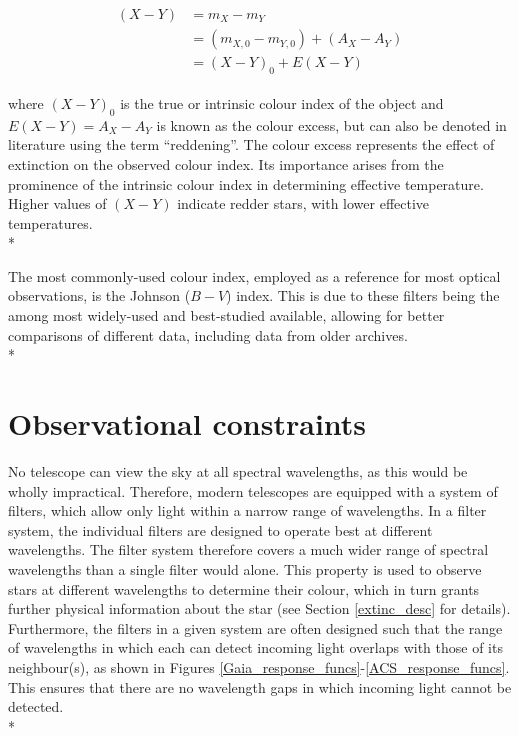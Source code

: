 \documentclass[12pt, a4paper]{report}
\begin{document}
\begin{align}
\begin{split}
(X-Y) &= m_{X} - m_{Y} \\
 &= (m_{X,0} - m_{Y,0}) + (A_{X} - A_{Y}) \\
 &= (X-Y)_{0} + E(X-Y)
\end{split}
\end{align}

where $(X-Y)_{0}$ is the true or intrinsic colour index of the object and $E(X-Y) = A_{X} - A_{Y}$ is known as the colour excess, but can also be denoted in literature using the term ``reddening''. The colour excess represents the effect of extinction on the observed colour index. Its importance arises from the prominence of the intrinsic colour index in determining effective temperature. Higher values of $(X-Y)$ indicate redder stars, with lower effective temperatures.\\*

The most commonly-used colour index, employed as a reference for most optical observations, is the Johnson ($B-V$) index. This is due to these filters being the among most widely-used and best-studied available, allowing for better comparisons of different data, including data from older archives.\\*

\section{Observational constraints}
No telescope can view the sky at all spectral wavelengths, as this would be wholly impractical. Therefore, modern telescopes are equipped with a system of filters, which allow only light within a narrow range of wavelengths. In a filter system, the individual filters are designed to operate best at different wavelengths. The filter system therefore covers a much wider range of spectral wavelengths than a single filter would alone. This property is used to observe stars at different wavelengths to determine their colour, which in turn grants further physical information about the star (see Section \ref{extinc_desc} for details). Furthermore, the filters in a given system are often designed such that the range of wavelengths in which each can detect incoming light overlaps with those of its neighbour(s), as shown in Figures \ref{Gaia_response_funcs}-\ref{ACS_response_funcs}. This ensures that there are no wavelength gaps in which incoming light cannot be detected.\\*
\end{document}
